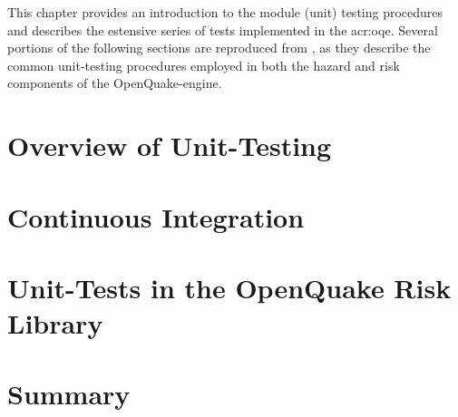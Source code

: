 This chapter provides an introduction to the module (unit) testing procedures \citep{myers2012} and describes the estensive series of tests implemented in the \gls{acr:oqe}. Several portions of the following sections are reproduced from \citet{pagani2014_oqtesting}, as they describe the common unit-testing procedures employed in both the hazard and risk components of the OpenQuake-engine.

\section{Overview of Unit-Testing}
\label{sec:ut-overview}


\section{Continuous Integration}
\label{sec:ut-ci}


\section{Unit-Tests in the OpenQuake Risk Library}
\label{sec:ut-risklib}


\section{Summary}
\label{sec:ut-summary}

